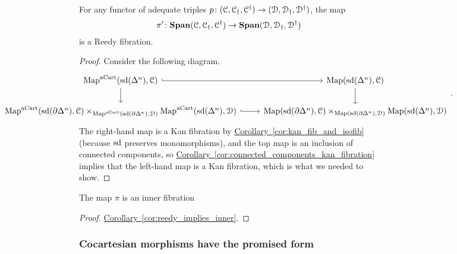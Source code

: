 \documentclass[main.tex]{subfiles}
\begin{document}
\begin{proposition}
  For any functor of adequate triples $p\colon (\mathcal{C}, \mathcal{C}_{\dagger}, \mathcal{C}^{\dagger}) \to (\mathcal{D}, \mathcal{D}_{\dagger}, \mathcal{D}^{\dagger})$, the map
  \begin{equation*}
    \pi'\colon \mathbf{Span}(\mathcal{C}, \mathcal{C}_{\dagger}, \mathcal{C}^{\dagger}) \to \mathbf{Span}(\mathcal{D}, \mathcal{D}_{\dagger}, \mathcal{D}^{\dagger})
  \end{equation*}
  is a Reedy fibration.
\end{proposition}
\begin{proof}
  Consider the following diagram.
  \begin{equation*}
    \noindent\makebox[\textwidth]{%
      \begin{tikzcd}[ampersand replacement=\&]
        \Fun^{\aCart}(\sd(\Delta^{n}), \category{C})
        \arrow[r, hook]
        \arrow[d]
        \& \Fun(\sd(\Delta^{n}), \category{C})
        \arrow[d]
        \\
        \Fun^{\aCart}(\sd(\partial\Delta^{n}), \category{C})
        \times_{\Fun^{\aCart}(\sd(\partial\Delta^{n}), \category{D})}
        \Fun^{\aCart}(\sd(\Delta^{n}), \category{D})
        \arrow[r, hook]
        \& \Fun(\sd(\partial\Delta^{n}), \category{C})
        \times_{\Fun(\sd(\partial\Delta^{n}), \category{D})}
        \Fun(\sd(\Delta^{n}), \category{D})
      \end{tikzcd}.
    }
  \end{equation*}
  The right-hand map is a Kan fibration by \hyperref[cor:kan_fib_and_isofib]{Corollary~\ref*{cor:kan_fib_and_isofib}} (because $\mathrm{sd}$ preserves monomorphisms), and the top map is an inclusion of connected components, so \hyperref[cor:connected_components_kan_fibration]{Corollary~\ref*{cor:connected_components_kan_fibration}} implies that the left-hand map is a Kan fibration, which is what we needed to show.
\end{proof}

\begin{corollary}
  The map $\pi$ is an inner fibration
\end{corollary}
\begin{proof}
  \hyperref[cor:reedy_implies_inner]{Corollary~\ref*{cor:reedy_implies_inner}}.
\end{proof}

\subsubsection{Cocartesian morphisms have the promised form}
\label{sss:cocartesian_morphisms_have_the_promised_form}
\end{document}
